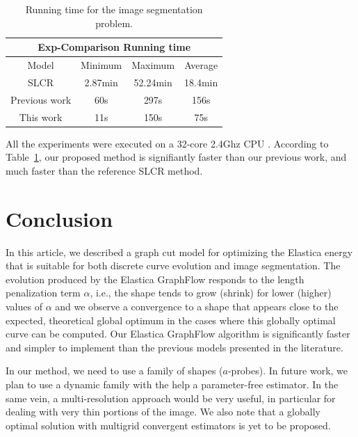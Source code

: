 \documentclass[runningheads]{llncs}
\newcommand{\daniel}[1]{ {\color{blue}#1} }
\begin{document}
\begin{table}
  \centering
 \caption{Running time for the image segmentation problem.}
\label{ch9:tab:rtime-image-segmentation-general} 
\captionsetup{type=table}
\begin{tabular}{|c|c|c|c|}
\hline
\multicolumn{4}{|c|}{Exp-Comparison Running time}\\
\hline
Model & Minimum & Maximum & Average \\
\hline
SLCR & 2.87min & 52.24min & 18.4min\\
Previous work & 60s & 297s & 156s\\
This work  & 11s & 150s & 75s\\
\hline
\end{tabular}
\end{table}

\daniel{All the experiments were executed on a 32-core 2.4Ghz CPU}. According to Table~\ref{ch9:tab:rtime-image-segmentation-general}, our proposed method is signifiantly faster than
our previous work, and much faster than the reference SLCR method.

\section{Conclusion}
In this article, we described a graph cut model for optimizing the Elastica energy that is suitable for both discrete curve evolution and
image segmentation. The evolution produced by the Elastica GraphFlow responds to the length penalization term $\alpha$,
i.e., the shape tends to grow (shrink) for lower (higher) values of $\alpha$ and we observe a convergence to a shape
that appears close to the expected, theoretical global optimum in the cases where this globally optimal curve can be
computed. Our Elastica GraphFlow algorithm is significantly faster and simpler to implement than the previous models
presented in the literature.

In our method, we need to use a family of shapes ($a$-probes). In future work, we plan to use a dynamic family with the
help a parameter-free estimator. In the same vein, a multi-resolution approach would be very useful, in particular for
dealing with very thin portions of the image. We also note that a globally optimal solution with multigrid convergent
estimators is yet to be proposed. 



\end{document}
